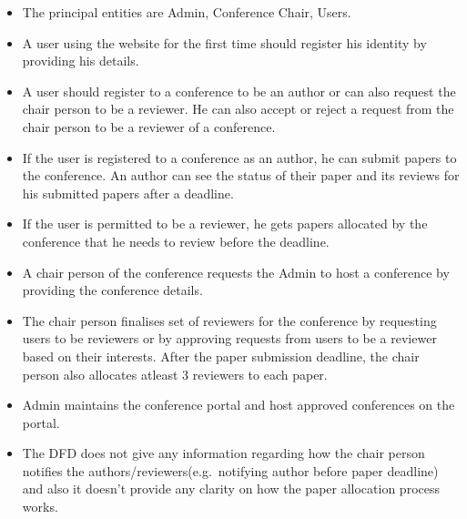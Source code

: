 \documentclass[english,a4paper,12pt]{report}
\begin{document}
\begin{enumerate}
\begin{itemize}
    \item The principal entities are Admin, Conference Chair, Users. 
    \item A user using the website for the first time should register his identity by providing his details. 
    \item A user should register to a conference to be an author or can also request the chair person to be a reviewer. He can also accept or reject a request from the chair person to be a reviewer of a conference.
    \item If the user is registered to a conference as an author, he can submit papers to the conference. An author can see the status of their paper and its reviews for his submitted papers after a deadline.
    \item If the user is permitted to be a reviewer, he gets papers allocated by the conference that he needs to review  before the deadline. 
    \item A chair person of the conference requests the Admin to host a conference by providing the conference details. 
    \item The chair person finalises set of reviewers for the conference by requesting users to be reviewers or by approving requests from users to be a reviewer based on their interests. After the paper submission deadline, the chair person also allocates atleast 3 reviewers to each paper.
    \item Admin maintains the conference portal and host approved conferences on the portal.
    \item The DFD does not give any information regarding how the chair person notifies the authors/reviewers(e.g.\ notifying author before paper deadline) and also it doesn't provide any clarity on how the paper allocation process works.
    

\end{itemize}
\end{enumerate}
\end{document}
